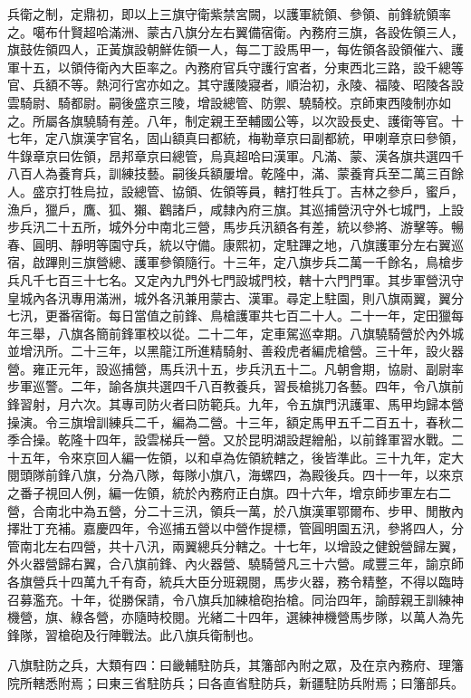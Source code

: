 \begin{pinyinscope}
兵衛之制，定鼎初，即以上三旗守衛紫禁宮闕，以護軍統領、參領、前鋒統領率之。噶布什賢超哈滿洲、蒙古八旗分左右翼備宿衛。內務府三旗，各設佐領三人，旗鼓佐領四人，正黃旗設朝鮮佐領一人，每二丁設馬甲一，每佐領各設領催六、護軍十五，以領侍衛內大臣率之。內務府官兵守護行宮者，分東西北三路，設千總等官、兵額不等。熱河行宮亦如之。其守護陵寢者，順治初，永陵、福陵、昭陵各設雲騎尉、騎都尉。嗣後盛京三陵，增設總管、防禦、驍騎校。京師東西陵制亦如之。所屬各旗驍騎有差。八年，制定親王至輔國公等，以次設長史、護衛等官。十七年，定八旗漢字官名，固山額真曰都統，梅勒章京曰副都統，甲喇章京曰參領，牛錄章京曰佐領，昂邦章京曰總管，烏真超哈曰漢軍。凡滿、蒙、漢各旗共選四千八百人為養育兵，訓練技藝。嗣後兵額屢增。乾隆中，滿、蒙養育兵至二萬三百餘人。盛京打牲烏拉，設總管、協領、佐領等員，轄打牲兵丁。吉林之參戶，蜜戶，漁戶，獵戶，鷹、狐、獺、鸛諸戶，咸隸內府三旗。其巡捕營汛守外七城門，上設步兵汛二十五所，城外分中南北三營，馬步兵汛額各有差，統以參將、游擊等。暢春、圓明、靜明等園守兵，統以守備。康熙初，定駐蹕之地，八旗護軍分左右翼巡宿，啟蹕則三旗營總、護軍參領隨行。十三年，定八旗步兵二萬一千餘名，鳥槍步兵凡千七百三十七名。又定內九門外七門設城門校，轄十六門門軍。其步軍營汛守皇城內各汛專用滿洲，城外各汛兼用蒙古、漢軍。尋定上駐園，則八旗兩翼，翼分七汛，更番宿衛。每日當值之前鋒、鳥槍護軍共七百二十人。二十一年，定田獵每年三舉，八旗各簡前鋒軍校以從。二十二年，定車駕巡幸期。八旗驍騎營於內外城並增汛所。二十三年，以黑龍江所進精騎射、善殺虎者編虎槍營。三十年，設火器營。雍正元年，設巡捕營，馬兵汛十五，步兵汛五十二。凡朝會期，協尉、副尉率步軍巡警。二年，諭各旗共選四千八百教養兵，習長槍挑刀各藝。四年，令八旗前鋒習射，月六次。其專司防火者曰防範兵。九年，令五旗門汛護軍、馬甲均歸本營操演。令三旗增訓練兵二千，編為二營。十三年，額定馬甲五千二百五十，春秋二季合操。乾隆十四年，設雲梯兵一營。又於昆明湖設趕繒船，以前鋒軍習水戰。二十五年，令來京回人編一佐領，以和卓為佐領統轄之，後皆準此。三十九年，定大閱頭隊前鋒八旗，分為八隊，每隊小旗八，海螺四，為殿後兵。四十一年，以來京之番子視回人例，編一佐領，統於內務府正白旗。四十六年，增京師步軍左右二營，合南北中為五營，分二十三汛，領兵一萬，於八旗漢軍鄂爾布、步甲、閒散內擇壯丁充補。嘉慶四年，令巡捕五營以中營作提標，管圓明園五汛，參將四人，分管南北左右四營，共十八汛，兩翼總兵分轄之。十七年，以增設之健銳營歸左翼，外火器營歸右翼，合八旗前鋒、內火器營、驍騎營凡三十六營。咸豐三年，諭京師各旗營兵十四萬九千有奇，統兵大臣分班親閱，馬步火器，務令精整，不得以臨時召募濫充。十年，從勝保請，令八旗兵加練槍砲抬槍。同治四年，諭醇親王訓練神機營，旗、綠各營，亦隨時校閱。光緒二十四年，選練神機營馬步隊，以萬人為先鋒隊，習槍砲及行陣戰法。此八旗兵衛制也。

八旗駐防之兵，大類有四：曰畿輔駐防兵，其籓部內附之眾，及在京內務府、理籓院所轄悉附焉；曰東三省駐防兵；曰各直省駐防兵，新疆駐防兵附焉；曰籓部兵。


\end{pinyinscope}
